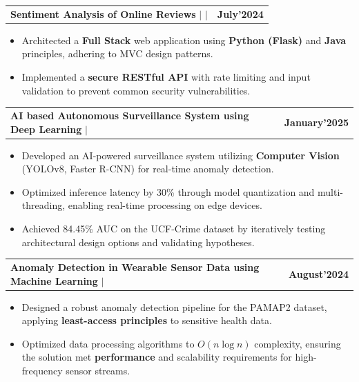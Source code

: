 \documentclass[letterpaper,11pt]{article}
\makeatletter
\newcommand{\resumeItem}[1]{
  \item\small{
    {#1 \vspace{-2pt}}
  }
}
\newcommand{\resumeProjectHeading}[2]{
    \item
    \begin{tabular*}{1.001\textwidth}{l@{\extracolsep{\fill}}r}
      \small#1 & \textbf{\small #2}\\
    \end{tabular*}\vspace{-7pt}
}
\newcommand{\resumeItemListStart}{\begin{itemize}}
\newcommand{\resumeItemListEnd}{\end{itemize}\vspace{-5pt}}
\makeatother
\begin{document}
\resumeProjectHeading
    {\textbf{Sentiment Analysis of Online Reviews } $|$ 
    \href{https://github.com/VedPawar1410/sentiment-analysis-web-app}{\faGithub}  $|$ \href{https://veds-sentiment-analysis-app.onrender.com/}{\faExternalLink*}}{July'2024}
    \vspace{-13pt}
    \resumeItemListStart
        \resumeItem{Architected a \textbf{Full Stack} web application using \textbf{Python (Flask)} and \textbf{Java} principles, adhering to MVC design patterns.} 
        
        \resumeItem{Implemented a \textbf{secure RESTful API} with rate limiting and input validation to prevent common security vulnerabilities.}
    \resumeItemListEnd
\vspace{-18pt}

\resumeProjectHeading
    {\textbf{AI based Autonomous Surveillance System using Deep Learning} $|$ \href{https://github.com/VedPawar1410/ai-autonomous-surveillance-system}{\faGithub}}{January'2025}
    \vspace{-13pt}
    \resumeItemListStart
        \resumeItem{Developed an AI-powered surveillance system utilizing \textbf{Computer Vision} (YOLOv8, Faster R-CNN) for real-time anomaly detection.}
        \resumeItem{Optimized inference latency by 30\% through model quantization and multi-threading, enabling real-time processing on edge devices.}
        \resumeItem{Achieved 84.45\% AUC on the UCF-Crime dataset by iteratively testing architectural design options and validating hypotheses.}
    \resumeItemListEnd
\vspace{-16pt}

\resumeProjectHeading
    {\textbf{Anomaly Detection in Wearable Sensor Data using Machine Learning} $|$ \href{https://github.com/VedPawar1410/Anomaly-Detection-in-Wearable-Sensor-Data}{\faGithub}}{August'2024}
     
    \vspace{-13pt}
    \resumeItemListStart
        \resumeItem{Designed a robust anomaly detection pipeline for the PAMAP2 dataset, applying \textbf{least-access principles} to sensitive health data.}
        \resumeItem{Optimized data processing algorithms to $O(n \log n)$ complexity, ensuring the solution met \textbf{performance} and scalability requirements for high-frequency sensor streams.}
    \resumeItemListEnd


\vspace{-2pt}

\end{document}
